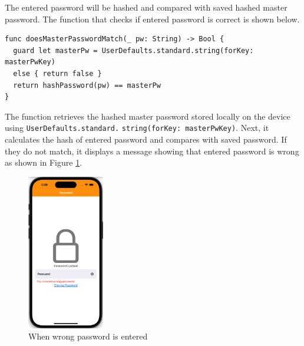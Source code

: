 \documentclass[10pt, titlepage]{article}
\begin{document}
The entered password will be hashed and compared with saved hashed master password. The function that checks if entered password is correct is shown below.
\begin{center}
\begin{minipage}{\linewidth}
\begin{lstlisting}
func doesMasterPasswordMatch(_ pw: String) -> Bool {
  guard let masterPw = UserDefaults.standard.string(forKey: masterPwKey)
  else { return false }
  return hashPassword(pw) == masterPw
}
\end{lstlisting}
\end{minipage}
\end{center}
The function retrieves the hashed master password stored locally on the device using \texttt{UserDefaults.standard.} \texttt{string(forKey: masterPwKey)}. Next, it calculates the hash of entered password and compares with saved password. If they do not match, it displays a message showing that entered password is wrong as shown in Figure \ref{fig:enter_wrong_pw}. 
\begin{figure}[H]
	\centering
	\vspace{-0.25em}
	\includegraphics[width=0.3\textwidth]{img/enter_wrong_pw}
	\vspace{-0.75em}
	\caption{When wrong password is entered}
	\label{fig:enter_wrong_pw}
	\vspace{-0.75em}
\end{figure}
\end{document}
